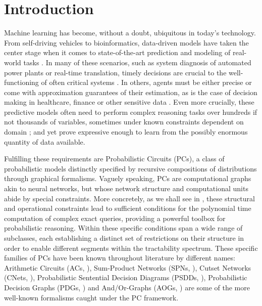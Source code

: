 \chapter{Introduction}

Machine learning has become, without a doubt, ubiquitous in today's technology. From self-driving
vehicles to bioinformatics, data-driven models have taken the center stage when it comes to
state-of-the-art prediction and modeling of real-world tasks \citep{grigorescu20,lan18,li19,khan18,
sezer20}. In many of these scenarios, such as system diagnosis of automated power plants or
real-time translation, timely decisions are crucial to the well-functioning of often critical
systems \citep{enshaei19,niehues18}. In others, agents must be either precise or come with
approximation guarantees of their estimation, as is the case of decision making in healthcare,
finance or other sensitive data \citep{lou19}. Even more crucially, these predictive models often
need to perform complex reasoning tasks over hundreds if not thousands of variables, sometimes
under known constraints dependent on domain \citep{xu18,marin20,wong12,lu13}; and yet prove
expressive enough to learn from the possibly enormous quantity of data available.

Fulfilling these requirements are Probabilistic Circuits (PCs), a class of probabilistic models
distinctly specified by recursive compositions of distributions through graphical formalisms.
Vaguely speaking, PCs are computational graphs akin to neural networks, but whose network structure
and computational units abide by special constraints. More concretely, as we shall see in
, these structural and operational constraints lead to sufficient conditions for the
polynomial time computation of complex exact queries, providing a powerful toolbox for
probabilistic reasoning. Within these specific conditions span a wide range of subclasses, each
establishing a distinct set of restrictions on their structure in order to enable different
segments within the tractability spectrum. These specific families of PCs have been known
throughout literature by different names: Arithmetic Circuits (ACs, \cite{darwiche03}), Sum-Product
Networks (SPNs, \cite{poon11}), Cutset Networks (CNets, \cite{rahman14}), Probabilistic Sentential
Decision Diagrams (PSDDs, \cite{kisa14}), Probabilistic Decision Graphs (PDGs, \cite{jaeger04}) and
And/Or-Graphs (AOGs, \cite{dechter07}) are some of the more well-known formalisms caught under the
PC framework.

